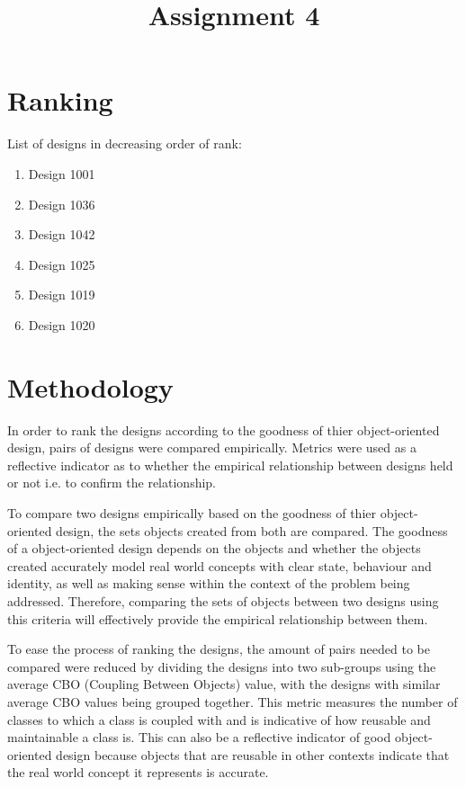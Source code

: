 \documentclass[conference]{IEEEtran}
\begin{document}
\title{Assignment 4}

\author{
}

\maketitle

\section{Ranking}
List of designs in decreasing order of rank:
\begin{enumerate}
	\item Design 1001
	\item Design 1036
	\item Design 1042
	\item Design 1025
	\item Design 1019
	\item Design 1020
\end{enumerate}

\section{Methodology}
In order to rank the designs according to the goodness of thier object-oriented design, pairs of designs were compared empirically. Metrics were used as a reflective indicator as to whether the empirical relationship between designs held or not i.e. to confirm the relationship. 

To compare two designs empirically based on the goodness of thier object-oriented design, the sets objects created from both are compared. The goodness of a object-oriented design depends on the objects and whether the objects created accurately model real world concepts with clear state, behaviour and identity, as well as making sense within the context of the problem being addressed. Therefore, comparing the sets of objects between two designs using this criteria will effectively provide the empirical relationship between them.

To ease the process of ranking the designs, the amount of pairs needed to be compared were reduced by dividing the designs into two sub-groups using the average CBO (Coupling Between Objects) value, with the designs with similar average CBO values being grouped together. This metric measures the number of classes to which a class is coupled with and is indicative of how reusable and maintainable a class is. This can also be a reflective indicator of good object-oriented design because objects that are reusable in other contexts indicate that the real world concept it represents is accurate. 
\end{document}

